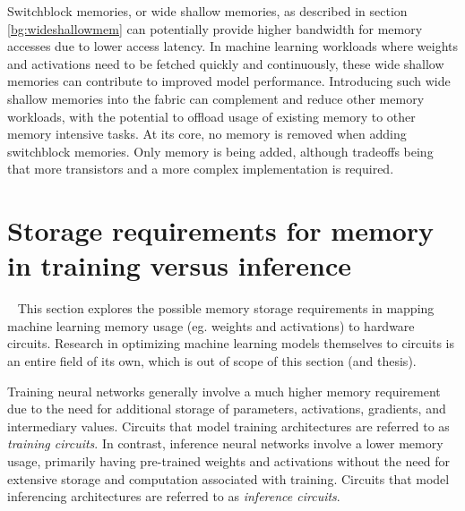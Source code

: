 Switchblock memories, or wide shallow memories, as described in section \ref{bg:wideshallowmem} can potentially provide higher bandwidth for memory accesses due to lower access latency. In machine learning workloads where weights and activations need to be fetched quickly and continuously, these wide shallow memories can contribute to improved model performance. Introducing such wide shallow memories into the fabric can complement and reduce other memory workloads, with the potential to offload usage of existing memory to other memory intensive tasks.
At its core, no memory is removed when adding switchblock memories. Only memory is being added, although tradeoffs being that more transistors and a more complex implementation is required.




\section{Storage requirements for memory in training versus inference}\
\label{context:storage}
This section explores the possible memory storage requirements in mapping machine learning memory usage (eg. weights and activations) to hardware circuits. 
Research in optimizing machine learning models themselves to circuits is an entire field of its own, which is out of scope of this section (and thesis).

\label{sec:trainingvsinference}
Training neural networks generally involve a much higher memory requirement due to the need for additional storage of parameters, activations, gradients, and intermediary values. Circuits that model training architectures are referred to as \textit{training circuits}.
In contrast, inference neural networks involve a lower memory usage, primarily having pre-trained weights and activations without the need for extensive storage and computation associated with training. Circuits that model inferencing architectures are referred to as \textit{inference circuits}.

